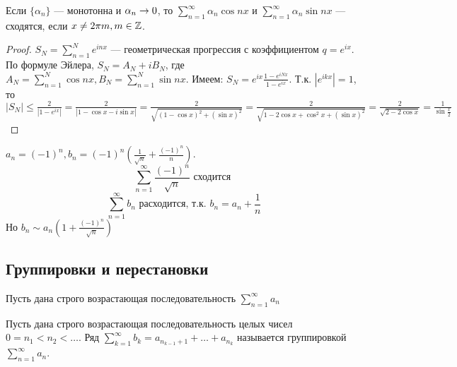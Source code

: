 \begin{corollary}
    Если \(\{\alpha_n\}\) --- монотонна и \(\alpha_n \rightarrow 0\), то \(\sum_{n = 1}^\infty \alpha_n \cos nx\) и \(\sum_{n = 1}^\infty \alpha_n \sin nx\) --- сходятся, если \(x \ne 2\pi m, m \in \mathbb{Z}\).
\end{corollary}
\begin{proof}
    \(S_N = \sum_{n = 1}^Ne^{inx}\) --- геометрическая прогрессия с коэффициентом \(q = e^{ix}\). По формуле Эйлера, \(S_N = A_N + iB_N\), где \(A_N = \sum_{n = 1}^N\cos nx, B_N = \sum_{n = 1}^N\sin nx\). Имеем: \(S_N = e^{ix}\frac{1 - e^{iNx}}{1 - e^{ix}}\). Т.к. \(|e^{ikx}| = 1\), то \(|S_N| \le \frac{2}{|1 - e^{ix}|} = \frac{2}{|1 - \cos x - i\sin x|} = \frac{2}{\sqrt{(1 - \cos x)^2 + (\sin x)^2}} = \frac{2}{\sqrt{1 - 2\cos x + \cos^2 x + (\sin x)^2}} = \frac{2}{\sqrt{2 - 2\cos x}} = \frac{1}{\sin \frac{x}{2}}\)
\end{proof}
\begin{example}
    \(a_n = (-1)^n, b_n = (-1)^n\left(\frac{1}{\sqrt{n}} + \frac{(-1)^n}{n}\right)\).
    \[\sum_{n = 1}^\infty \frac{(-1)^n}{\sqrt{n}} \text{ сходится }\]
    \[\sum_{n = 1}^\infty b_n \text{ расходится, т.к. } b_n = a_n + \frac{1}{n}\]
    Но \(b_n \sim a_n\left(1 + \frac{(-1)^n}{\sqrt{n}}\right)\)
\end{example}
\subsection{Группировки и перестановки}
Пусть дана строго возрастающая последовательность \(\sum_{n = 1}^\infty a_n\)
\begin{definition}
    Пусть дана строго возрастающая последовательность целых чисел  \(0 = n_1 < n_2 < \dots\). Ряд \(\sum_{k = 1}^\infty b_k = a_{n_{k - 1} + 1} + \dots + a_{n_{k}}\) называется группировкой \(\sum_{n = 1}^\infty a_n\).
\end{definition}

